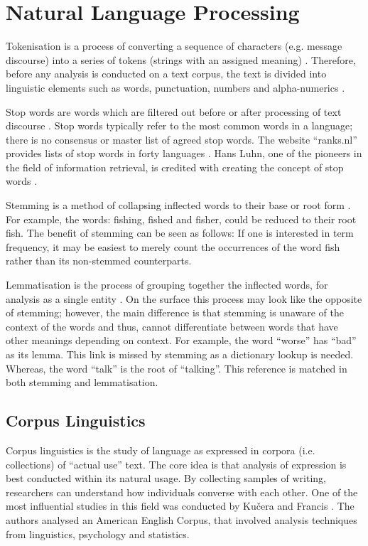 \section{Natural Language Processing}

Tokenisation is a process of converting a sequence of characters (e.g. message discourse) into a series of tokens (strings with an assigned meaning) \cite{jurafsky2014speech}. Therefore, before any analysis is conducted on a text corpus, the text is divided into linguistic elements such as words, punctuation, numbers and alpha-numerics \cite{webster1992tokenization}. 

Stop words are words which are filtered out before or after processing of text discourse \cite{leskovec2014mining}. Stop words typically refer to the most common words in a language; there is no consensus or master list of agreed stop words. The website ``ranks.nl'' provides lists of stop words in forty languages \cite{ranknl}. Hans Luhn, one of the pioneers in the field of information retrieval, is credited with creating the concept of stop words \cite{luhn1960key}.

Stemming is a method of collapsing inflected words to their base or root form \cite{lovins1968development}. For example, the words: fishing, fished and fisher, could be reduced to their root fish. The benefit of stemming can be seen as follows: If one is interested in term frequency, it may be easiest to merely count the occurrences of the word fish rather than its non-stemmed counterparts.

Lemmatisation is the process of grouping together the inflected words, for analysis as a single entity \cite{manning1995introduction}. On the surface this process may look like the opposite of stemming; however, the main difference is that stemming is unaware of the context of the words and thus, cannot differentiate between words that have other meanings depending on context. For example, the word ``worse''  has ``bad'' as its lemma. This link is missed by stemming as a dictionary lookup is needed. Whereas, the word ``talk'' is the root of ``talking''. This reference is matched in both stemming and lemmatisation.

\subsection{Corpus Linguistics}

Corpus linguistics is the study of language as expressed in corpora (i.e. collections) of ``actual use'' text. The core idea is that analysis of expression is best conducted within its natural usage. By collecting samples of writing, researchers can understand how individuals converse with each other. One of the most influential studies in this field was conducted by Ku{\v{c}}era and Francis \cite{kuvcera1967computational}. The authors analysed an American English Corpus, that involved analysis techniques from linguistics, psychology and statistics.

